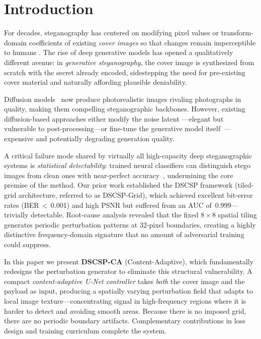 \documentclass[journal]{IEEEtran}
\begin{document}
\section{Introduction}
\label{sec:intro}

For decades, steganography has centered on modifying pixel values or transform-domain
coefficients of existing \emph{cover images} so that changes remain imperceptible to humans
\cite{cox2007digital}.
The rise of deep generative models has opened a qualitatively different avenue:
in \emph{generative steganography}, the cover image is synthesized from scratch with the secret
already encoded, sidestepping the need for pre-existing cover material and naturally affording
plausible deniability.

Diffusion models~\cite{ho2020denoising,song2020denoising} now produce photorealistic images
rivaling photographs in quality, making them compelling steganographic backbones.
However, existing diffusion-based approaches either modify the noise latent
\cite{wei2023diffusionstego}---elegant but vulnerable to post-processing---or fine-tune the
generative model itself~\cite{peng2023stegodiffusion,zhang2024ldstega}---expensive and
potentially degrading generation quality.

A critical failure mode shared by virtually all high-capacity deep steganographic systems is
\emph{statistical detectability}: trained neural classifiers can distinguish stego images from
clean ones with near-perfect accuracy~\cite{boroumand2019deep,fridrich2012rich}, undermining
the core premise of the method.
Our prior work established the DSCSP framework (tiled-grid architecture, referred to as
DSCSP\nobreakdash-Grid), which achieved excellent bit-error rates (BER\,$<$\,0.001) and high
PSNR but suffered from an AUC of~$0.999$---trivially detectable.
Root-cause analysis revealed that the fixed $8\times8$ spatial tiling generates periodic
perturbation patterns at 32-pixel boundaries, creating a highly distinctive frequency-domain
signature that no amount of adversarial training could suppress.

In this paper we present \textbf{DSCSP-CA} (Content-Adaptive), which fundamentally redesigns
the perturbation generator to eliminate this structural vulnerability.
A compact \emph{content-adaptive U-Net controller} takes \emph{both} the cover image and the
payload as input, producing a spatially varying perturbation field that adapts to local image
texture---concentrating signal in high-frequency regions where it is harder to detect and
avoiding smooth areas.
Because there is no imposed grid, there are no periodic boundary artifacts.
Complementary contributions in loss design and training curriculum complete the system.
\end{document}
